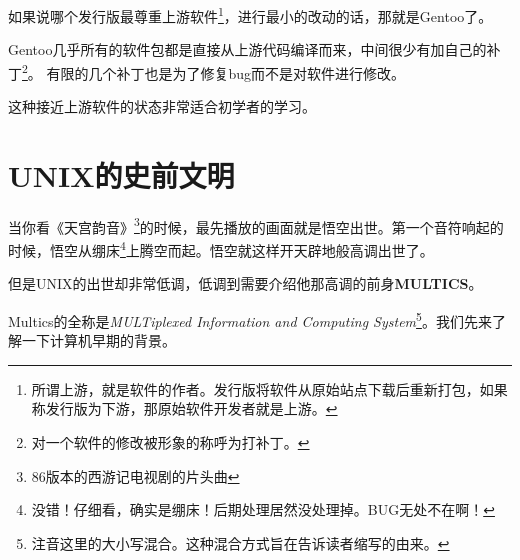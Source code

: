 \documentclass[amstex]{ctexbook}
\begin{document}
如果说哪个发行版最尊重上游软件\footnote{所谓上游，就是软件的作者。发行版将软件从原始站点下载后重新打包，如果称发行版为下游，那原始软件开发者就是上游。}，进行最小的改动的话，那就是Gentoo了。

Gentoo几乎所有的软件包都是直接从上游代码编译而来，中间很少有加自己的补丁\footnote{对一个软件的修改被形象的称呼为打补丁。}。
有限的几个补丁也是为了修复bug而不是对软件进行修改。

这种接近上游软件的状态非常适合初学者的学习。

\section{UNIX的史前文明}

当你看《天宫韵音》\footnote{86版本的西游记电视剧的片头曲}的时候，最先播放的画面就是悟空出世。第一个音符响起的时候，悟空从绷床\footnote{没错！仔细看，确实是绷床！后期处理居然没处理掉。BUG无处不在啊！}上腾空而起。悟空就这样开天辟地般高调出世了。

但是UNIX的出世却非常低调，低调到需要介绍他那高调的前身\textbf{MULTICS}。

Multics的全称是\textit{MULTiplexed Information and Computing System}\footnote{注音这里的大小写混合。这种混合方式旨在告诉读者缩写的由来。}。我们先来了解一下计算机早期的背景。
\end{document}
